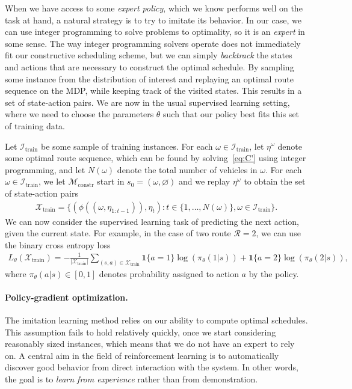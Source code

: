 \documentclass{report}
\theoremstyle{definition}
\theoremstyle{plain}
\begin{document}
When we have access to some \emph{expert policy}, which we know performs well on
the task at hand, a natural strategy is to try to imitate its behavior.
%
In our case, we can use integer programming to solve problems to optimality, so
it is an \emph{expert} in some sense.
%
The way integer programming solvers operate does not immediately fit our
constructive scheduling scheme, but we can simply \emph{backtrack} the states
and actions that are necessary to construct the optimal schedule.
%
By sampling some instance from the distribution of interest and replaying an
optimal route sequence on the MDP, while keeping track of the visited states.
This results in a set of state-action pairs. We are now in the usual supervised
learning setting, where we need to choose the parameters $\theta$ such that our
policy best fits this set of training data.

Let $\mathcal{I}_\mathrm{train}$ be some sample of training instances. For each
$\omega \in \mathcal{I}_\mathrm{train}$, let $\eta^\omega$ denote some optimal route sequence,
which can be found by solving~\eqref{eq:C'} using integer programming, and let $N(\omega)$
denote the total number of vehicles in $\omega$.
%
For each $\omega \in \mathcal{I}_\mathrm{train}$, we let
$\mathcal{M}_\mathrm{constr}$ start in $s_0 = (\omega, \varnothing)$ and we
replay $\eta^\omega$ to obtain the set of state-action pairs
\begin{align}
  \label{eq:2}
  \mathcal{X}_\mathrm{train} = \{ (\phi((\omega, \eta_{1:t-1})), \eta_{t}): t \in \{1, \dots, N(\omega) \} , \omega \in \mathcal{I}_\mathrm{train}\} .
\end{align}
%
We can now consider the supervised learning task of predicting the next action, given the current state.
%
For example, in the case of two route $\mathcal{R} = 2$, we can use the binary
cross entropy loss
\begin{align}
  L_\theta(\mathcal{X}_\mathrm{train}) = -\frac{1}{|\mathcal{X}_\mathrm{train}|} \sum_{(s,a) \in \mathcal{X}_\mathrm{train}} \mathbf{1}\{a = 1\} \log(\pi_\theta(1 | s)) + \mathbf{1}\{a = 2\}\log( \pi_\theta(2 | s) ) ,
\end{align}
where $\pi_\theta(a | s) \in [0,1]$ denotes probability assigned to action $a$
by the policy.

\paragraph{Policy-gradient optimization.}

The imitation learning method relies on our ability to compute optimal
schedules. This assumption fails to hold relatively quickly, once we start
considering reasonably sized instances, which means that we do not have an
expert to rely on.
%
A central aim in the field of reinforcement learning is to automatically
discover good behavior from direct interaction with the system. In other words,
the goal is to \emph{learn from experience} rather than from demonstration.
\end{document}
